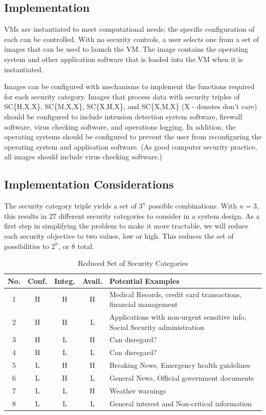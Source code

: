 \documentclass{acm_proc_article-sp}
\begin{document}
\subsection{Implementation}

 VMs are instantiated to meet computational needs; the specific configuration of each can be controlled.  With no security controls, a user selects one from a set of images that can be used to launch the VM.  The image contains the operating system and other application software that is loaded into the VM when it is instantiated. 
 
 Images can be configured with mechanisms to implement the functions required for each security category.  Images that process data with security triples of  SC\{H,X,X\}, SC\{M,X,X\}, SC\{X,H,X\}, and SC\{X,M,X\} (X - denotes don't care) should be configured to include intrusion detection system software, firewall software, virus checking software, and operations logging.  In addition, the operating systems should be configured to prevent the user from reconfiguring the operating system and application software.   (As good computer security practice, all images should include virus checking software.)
 
\subsection{Implementation Considerations}

The security category triple yields a set of $3^{n}$ possible combinations.  With $n = 3$, this results in 27 different security categories to consider in a system design.  As a first step in simplifying the problem to make it more tractable, we will reduce each security objective to two values, low or high.  This reduces the set of possibilities to $2^{n}$, or 8 total.

\begin{table}
\begin{tabular}{|c|c|c|c|p{1.3in}|}
\hline
No. & Conf. & Integ. & Avail. & Potential Examples \\
\hline
1 & H & H & H & Medical Records, 
credit card transactions,
financial management \\
\hline
2 & H & H & L & Applications with non-urgent sensitive info, 
Social Security administration \\
\hline
3 & H & L & H & Can disregard? \\
\hline
4 & H & L & L & Can disregard? \\
\hline
5 & L & H & H & Breaking News, 
                Emergency health guidelines \\
\hline
6 & L & H & L & General News,
                Official government documents \\
\hline
7 & L & L & H & Weather warnings \\
\hline
8 & L & L & L & General interest and
                Non-critical information \\
\hline
\end{tabular} 
\caption{Reduced Set of Security Categories}
\end{table}
\end{document}
